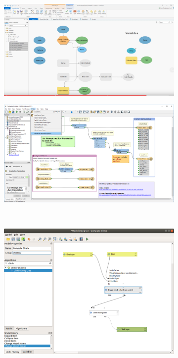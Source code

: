 \begin{figure}
\centering
\begin{subfigure}[b]{0.45\linewidth}
  \graphicspath{{../../assets/images/background/geo-vpl/}}
  \centering
  \includegraphics[width=\linewidth]{arcgis.png}
  \caption{}\label{fig:gisvpl:1}
\end{subfigure}%
\qquad 
\begin{subfigure}[b]{0.45\linewidth}
  \graphicspath{{../../assets/images/background/geo-vpl/}}
  \centering
  \includegraphics[width=\linewidth]{fme.png}
  \caption{}\label{fig:gisvpl:2}
\end{subfigure}%
\\
\begin{subfigure}[c]{0.45\linewidth}
  \centering
  \graphicspath{{../../assets/images/background/geo-vpl/}}
  \includegraphics[width=\linewidth]{qgis.png}

\end{subfigure}
\end{figure}
